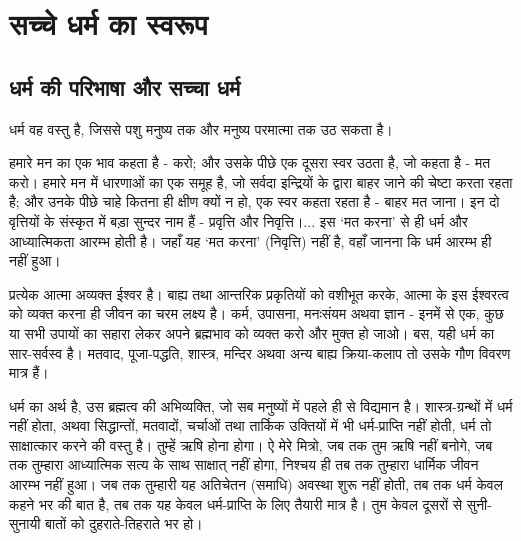 
\chapter{सच्चे धर्म का स्वरूप }

\indentsecionsintoc



\section*{धर्म की परिभाषा और सच्चा धर्म}


धर्म वह वस्तु है, जिससे पशु मनुष्य तक और मनुष्य परमात्मा तक उठ सकता है। 

हमारे मन का एक भाव कहता है - करो; और उसके पीछे एक दूसरा स्वर उठता है, जो कहता है - मत करो। हमारे मन में धारणाओं का एक समूह है, जो सर्वदा इन्द्रियों के द्वारा बाहर जाने की चेष्टा करता रहता है; और उनके पीछे चाहे कितना ही क्षीण क्यों न हो, एक स्वर कहता रहता है - बाहर मत जाना। इन दो वृत्तियों के संस्कृत में बड़ा सुन्दर नाम हैं - प्रवृत्ति और निवृत्ति।... इस ‘मत करना’ से ही धर्म और आध्यात्मिकता आरम्भ होती है। जहाँ यह ‘मत करना’ (निवृत्ति) नहीं है, वहाँ जानना कि धर्म आरम्भ ही नहीं हुआ। 

प्रत्येक आत्मा अव्यक्त ईश्वर है। बाह्य तथा आन्तरिक प्रकृतियों को वशीभूत करके, आत्मा के इस ईश्वरत्व को व्यक्त करना ही जीवन का चरम लक्ष्य है। कर्म, उपासना, मनःसंयम अथवा ज्ञान - इनमें से एक, कुछ या सभी उपायों का सहारा लेकर अपने ब्रह्मभाव को व्यक्त करो और मुक्त हो जाओ। बस, यही धर्म का सार-सर्वस्व है। मतवाद, पूजा-पद्धति, शास्त्र, मन्दिर अथवा अन्य बाह्य क्रिया-कलाप तो उसके गौण विवरण मात्र हैं। 

धर्म का अर्थ है, उस ब्रह्मत्व की अभिव्यक्ति, जो सब मनुष्यों में पहले ही से विद्यमान है। शास्त्र-ग्रन्थों में धर्म नहीं होता, अथवा सिद्धान्तों, मतवादों, चर्चाओं तथा तार्किक उक्तियों में भी धर्म-प्राप्ति नहीं होती, धर्म तो साक्षात्कार करने की वस्तु है। तुम्हें ऋषि होना होगा। ऐ मेरे मित्रो, जब तक तुम ऋषि नहीं बनोगे, जब तक तुम्हारा आध्यात्मिक सत्य के साथ साक्षात् नहीं होगा, निश्चय ही तब तक तुम्हारा धार्मिक जीवन आरम्भ नहीं हुआ। जब तक तुम्हारी यह अतिचेतन (समाधि) अवस्था शुरू नहीं होती, तब तक धर्म केवल कहने भर की बात है, तब तक यह केवल धर्म-प्राप्ति के लिए तैयारी मात्र है। तुम केवल दूसरों से सुनी-सुनायी बातों को दुहराते-तिहराते भर हो। 

